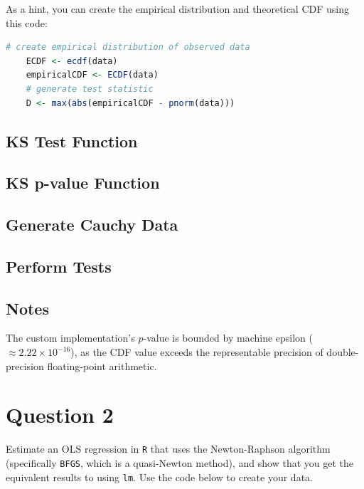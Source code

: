 \documentclass[12pt,letterpaper]{article}
\begin{document}
	
\noindent As a hint, you can create the empirical distribution and theoretical CDF using this code:

\begin{lstlisting}[language=R]
	# create empirical distribution of observed data
	ECDF <- ecdf(data)
	empiricalCDF <- ECDF(data)
	# generate test statistic
	D <- max(abs(empiricalCDF - pnorm(data))) \end{lstlisting}

\vspace{.5in}

\subsection*{KS Test Function} 

	  

\subsection*{KS p-value Function} 

  

\subsection*{Generate Cauchy Data}

  

\subsection*{Perform Tests}	

 




\subsection*{Notes}
 \noindent  The custom implementation's $p$-value is bounded by machine epsilon ($\approx 2.22 \times 10^{-16}$), as the CDF value exceeds the representable precision of double-precision floating-point arithmetic.


\section*{Question 2}
\noindent Estimate an OLS regression in \texttt{R} that uses the Newton-Raphson algorithm (specifically \texttt{BFGS}, which is a quasi-Newton method), and show that you get the equivalent results to using \texttt{lm}. Use the code below to create your data.
\vspace{.5cm}
 
\vspace*{.5cm}
\end{document}
